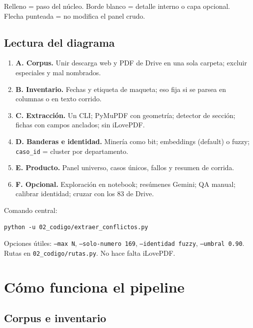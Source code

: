 \documentclass[11pt,a4paper]{article}
\begin{document}
\begin{center}
\small\color{upgray}
Relleno = paso del núcleo.\quad
Borde blanco = detalle interno o capa opcional.\quad
Flecha punteada = no modifica el panel crudo.
\end{center}

\subsection{Lectura del diagrama}

\begin{enumerate}
  \item \textbf{A. Corpus.} Unir descarga web y PDF de Drive en una sola carpeta; excluir especiales y mal nombrados.
  \item \textbf{B. Inventario.} Fechas y etiqueta de maqueta; eso fija si se parsea en columnas o en texto corrido.
  \item \textbf{C. Extracción.} Un CLI; PyMuPDF con geometría; detector de sección; fichas con campos anclados; sin iLovePDF.
  \item \textbf{D. Banderas e identidad.} Minería como bit; embeddings (default) o fuzzy; \texttt{caso\_id} = cluster por departamento.
  \item \textbf{E. Producto.} Panel universo, casos únicos, fallos y resumen de corrida.
  \item \textbf{F. Opcional.} Exploración en notebook; resúmenes Gemini; QA manual; calibrar identidad; cruzar con los 83 de Drive.
\end{enumerate}

Comando central:

\begin{verbatim}
python -u 02_codigo/extraer_conflictos.py
\end{verbatim}

Opciones útiles: \texttt{--max N}, \texttt{--solo-numero 169}, \texttt{--identidad fuzzy}, \texttt{--umbral 0.90}. Rutas en \texttt{02\_codigo/rutas.py}. No hace falta iLovePDF.

\section{Cómo funciona el pipeline}

\subsection{Corpus e inventario}
\end{document}
